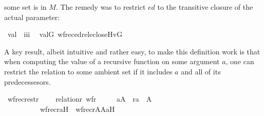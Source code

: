 some set is in $M$. The remedy was to restrict $\mathit{ed}$ to the
transitive closure of the actual parameter:
\begin{isabelle}
\isamarkupfalse%
\isanewline
\ val\ {\isacharcolon}{\isacharcolon}\ {\isachardoublequoteopen}i{\isasymRightarrow}i{\isasymRightarrow}i{\isachardoublequoteclose}\ \isanewline
\ {\isachardoublequoteopen}val{\isacharparenleft}G{\isacharcomma}{\isasymtau}{\isacharparenright}{\isacharequal}{\isacharequal}\ wfrec{\isacharparenleft}edrel{\isacharparenleft}eclose{\isacharparenleft}{\isacharbraceleft}{\isasymtau}{\isacharbraceright}{\isacharparenright}{\isacharparenright}{\isacharcomma}{\isasymtau}{\isacharcomma}Hv{\isacharparenleft}G{\isacharparenright}{\isacharparenright}{\isachardoublequoteclose}
\end{isabelle}
A key result, albeit intuitive and rather easy, to make this
definition work is that when computing the value of a recursive
function on some argument $a$, one can restrict the relation to some
ambient set if it includes $a$ and all of its predecessesors.
\begin{isabelle}
\isamarkupfalse%
\ wfrec{\isacharunderscore}restr\ {\isacharcolon}\isanewline
\ \ \ {\isachardoublequoteopen}relation{\isacharparenleft}r{\isacharparenright}{\isachardoublequoteclose}\ {\isachardoublequoteopen}wf{\isacharparenleft}r{\isacharparenright}{\isachardoublequoteclose}\ \isanewline
\ \ \ \ {\isachardoublequoteopen}a{\isasymin}A\ {\isasymLongrightarrow}\ {\isacharparenleft}r{\isacharcircum}{\isacharplus}{\isacharparenright}{\isacharminus}{\isacharbackquote}{\isacharbackquote}{\isacharbraceleft}a{\isacharbraceright}\ {\isasymsubseteq}\ A\ {\isasymLongrightarrow}\ \isanewline
\ \ \ \ \ \ \ \ \ \ wfrec{\isacharparenleft}r{\isacharcomma}a{\isacharcomma}H{\isacharparenright}\ {\isacharequal}\ wfrec{\isacharparenleft}r{\isasyminter}A{\isasymtimes}A{\isacharcomma}a{\isacharcomma}H{\isacharparenright}{\isachardoublequoteclose}
\end{isabelle}


